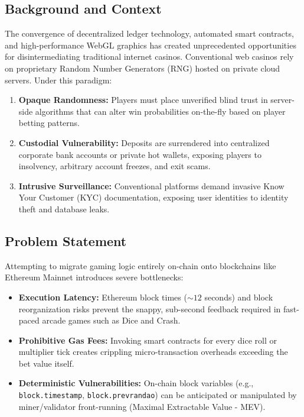 \subsection{Background and Context}
The convergence of decentralized ledger technology, automated smart contracts, and high-performance WebGL graphics has created unprecedented opportunities for disintermediating traditional internet casinos. Conventional web casinos rely on proprietary Random Number Generators (RNG) hosted on private cloud servers. Under this paradigm:
\begin{enumerate}[leftmargin=1.5em]
    \item \textbf{Opaque Randomness:} Players must place unverified blind trust in server-side algorithms that can alter win probabilities on-the-fly based on player betting patterns.
    \item \textbf{Custodial Vulnerability:} Deposits are surrendered into centralized corporate bank accounts or private hot wallets, exposing players to insolvency, arbitrary account freezes, and exit scams.
    \item \textbf{Intrusive Surveillance:} Conventional platforms demand invasive Know Your Customer (KYC) documentation, exposing user identities to identity theft and database leaks.
\end{enumerate}

\subsection{Problem Statement}
Attempting to migrate gaming logic entirely on-chain onto blockchains like Ethereum Mainnet introduces severe bottlenecks:
\begin{itemize}[leftmargin=1.5em]
    \item \textbf{Execution Latency:} Ethereum block times ($\sim 12$ seconds) and block reorganization risks prevent the snappy, sub-second feedback required in fast-paced arcade games such as Dice and Crash.
    \item \textbf{Prohibitive Gas Fees:} Invoking smart contracts for every dice roll or multiplier tick creates crippling micro-transaction overheads exceeding the bet value itself.
    \item \textbf{Deterministic Vulnerabilities:} On-chain block variables (e.g., \texttt{block.timestamp}, \texttt{block.prevrandao}) can be anticipated or manipulated by miner/validator front-running (Maximal Extractable Value - MEV).
\end{itemize}

